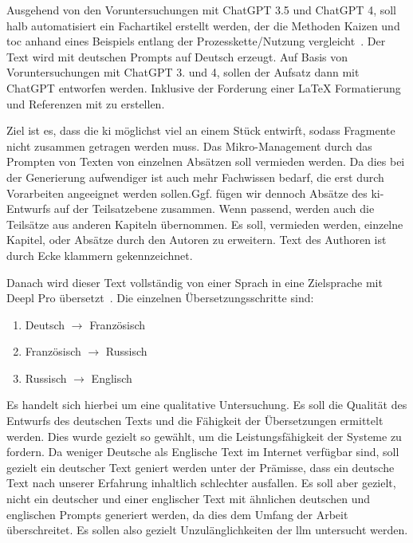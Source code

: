 
Ausgehend von den Voruntersuchungen mit ChatGPT 3.5 und ChatGPT 4, soll halb automatisiert ein Fachartikel erstellt werden,
der die Methoden Kaizen und \gls{toc} anhand eines Beispiels entlang der Prozesskette/Nutzung vergleicht~\cite{openai_chatgpt_nodate}. 
Der Text wird mit deutschen Prompts auf Deutsch erzeugt. Auf Basis von Voruntersuchungen mit ChatGPT 3. und 4, sollen der Aufsatz dann mit ChatGPT entworfen werden. Inklusive der Forderung einer \LaTeX{} Formatierung und Referenzen mit \BibTeX{} zu erstellen.

Ziel ist es, dass die \gls{ki} möglichst viel an einem Stück entwirft, sodass Fragmente nicht zusammen getragen werden muss. Das Mikro-Management durch das Prompten von Texten von einzelnen Absätzen soll vermieden werden. Da dies bei der Generierung aufwendiger ist auch mehr Fachwissen bedarf, die erst durch Vorarbeiten angeeignet werden sollen.Ggf. fügen wir dennoch Absätze des \gls{ki}-Entwurfs auf der Teilsatzebene zusammen. Wenn passend, werden auch die Teilsätze aus anderen Kapiteln übernommen. Es soll, vermieden werden, einzelne Kapitel, oder Absätze durch den Autoren zu erweitern. Text des Authoren ist durch Ecke klammern gekennzeichnet.

Danach wird dieser Text vollständig von einer Sprach in eine Zielsprache mit Deepl Pro übersetzt~\cite{deepl_deepl_nodate}.
Die einzelnen Übersetzungsschritte sind:

\begin{enumerate}
	\item Deutsch $\rightarrow$ Französisch
	\item Französisch $\rightarrow$ Russisch
	\item Russisch $\rightarrow$ Englisch
\end{enumerate}

Es handelt sich hierbei um eine qualitative Untersuchung. Es soll die Qualität des Entwurfs des deutschen Texts und die Fähigkeit der Übersetzungen ermittelt werden. Dies wurde gezielt so gewählt, um die Leistungsfähigkeit der Systeme zu fordern. Da weniger Deutsche als Englische Text im Internet verfügbar sind, soll gezielt ein deutscher Text geniert werden unter der Prämisse, dass ein deutsche Text nach unserer Erfahrung inhaltlich schlechter ausfallen. Es soll aber gezielt, nicht ein deutscher und einer englischer Text mit ähnlichen deutschen und englischen Prompts generiert werden, da dies dem Umfang der Arbeit überschreitet. Es sollen also gezielt Unzulänglichkeiten der \gls{llm} untersucht werden.

